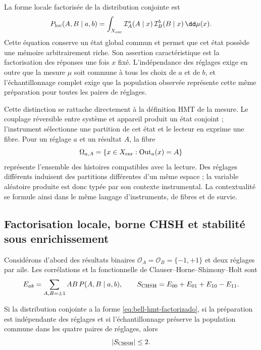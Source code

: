 La forme locale factorisée de la distribution conjointe est
\begin{equation}
 P_{\rm loc}(A,B\mid a,b)
 =\int_{X_{\rm enr}}
   \mathcal I_A^a(A\mid x)\,
   \mathcal I_B^b(B\mid x)\,\dd\mu(x).
 \label{eq:bell-hmt-factorizado}
\end{equation}
Cette équation conserve un état global commun et permet que cet état possède une mémoire arbitrairement riche. Son assertion caractéristique est la factorisation des réponses une fois \(x\) fixé. L’indépendance des réglages exige en outre que la mesure \(\mu\) soit commune à tous les choix de \(a\) et de \(b\), et l’échantillonnage complet exige que la population observée représente cette même préparation pour toutes les paires de réglages.

Cette distinction se rattache directement à la définition HMT de la mesure. Le couplage réversible entre système et appareil produit un état conjoint ; l’instrument sélectionne une partition de cet état et le lecteur en exprime une fibre. Pour un réglage \(a\) et un résultat \(A\), la fibre
\[
 \Omega_{a,A}
 =\{x\in X_{\rm enr}:\operatorname{Out}_a(x)=A\}
\]
représente l’ensemble des histoires compatibles avec la lecture. Des réglages différents induisent des partitions différentes d’un même espace ; la variable aléatoire produite est donc typée par son contexte instrumental. La contextualité se formule ainsi dans le même langage d’instruments, de fibres et de survie.

\subsection{Factorisation locale, borne CHSH et stabilité sous enrichissement}

Considérons d’abord des résultats binaires \(\mathcal O_A=\mathcal O_B=\{-1,+1\}\) et deux réglages par aile. Les corrélations et la fonctionnelle de Clauser--Horne--Shimony--Holt \cite{ClauserHorneShimonyHolt1969} sont
\begin{equation}
 E_{ab}=\sum_{A,B=\pm1}AB\,P(A,B\mid a,b),
 \qquad
 S_{\rm CHSH}=E_{00}+E_{01}+E_{10}-E_{11}.
 \label{eq:chsh}
\end{equation}

\begin{theorem}
\label{thm:chsh-local}
Si la distribution conjointe a la forme \eqref{eq:bell-hmt-factorizado}, si la préparation est indépendante des réglages et si l’échantillonnage préserve la population commune dans les quatre paires de réglages, alors
\[
 \lvert S_{\rm CHSH}\rvert\leq2.
\]
\end{theorem}

